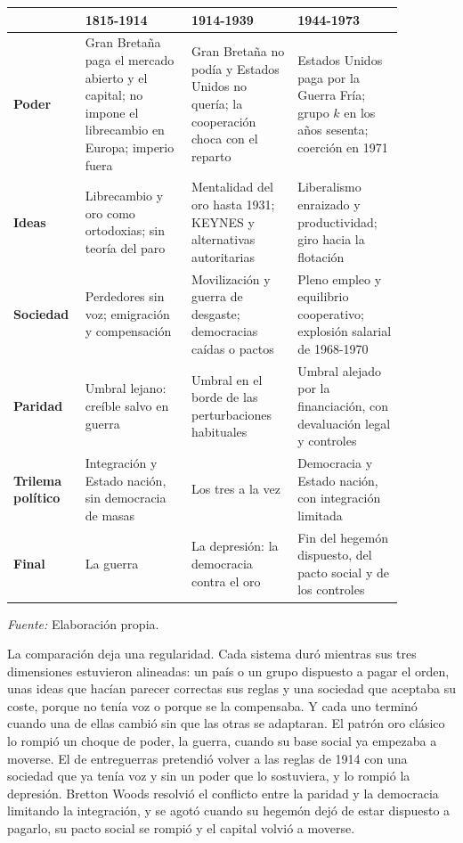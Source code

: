 \documentclass[10pt,a4paper]{article}
\begin{document}
\begin{center}\begin{minipage}{\linewidth}\par\vspace{0.3em}
{\footnotesize
\begin{tabular}{|p{0.12\linewidth}|p{0.25\linewidth}|p{0.25\linewidth}|p{0.25\linewidth}|}
\hline
 & \textbf{1815-1914} & \textbf{1914-1939} & \textbf{1944-1973} \\
\hline
\textbf{Poder} & Gran Bretaña paga el mercado abierto y el capital; no impone el librecambio en Europa; imperio fuera & Gran Bretaña no podía y Estados Unidos no quería; la cooperación choca con el reparto & Estados Unidos paga por la Guerra Fría; grupo $k$ en los años sesenta; coerción en 1971 \\
\hline
\textbf{Ideas} & Librecambio y oro como ortodoxias; sin teoría del paro & Mentalidad del oro hasta 1931; KEYNES y alternativas autoritarias & Liberalismo enraizado y productividad; giro hacia la flotación \\
\hline
\textbf{Sociedad} & Perdedores sin voz; emigración y compensación & Movilización y guerra de desgaste; democracias caídas o pactos & Pleno empleo y equilibrio cooperativo; explosión salarial de 1968-1970 \\
\hline
\textbf{Paridad} & Umbral lejano: creíble salvo en guerra & Umbral en el borde de las perturbaciones habituales & Umbral alejado por la financiación, con devaluación legal y controles \\
\hline
\textbf{Trilema político} & Integración y Estado nación, sin democracia de masas & Los tres a la vez & Democracia y Estado nación, con integración limitada \\
\hline
\textbf{Final} & La guerra & La depresión: la democracia contra el oro & Fin del hegemón dispuesto, del pacto social y de los controles \\
\hline
\end{tabular}}\par\vspace{0.3em} {\small\textit{Fuente: }Elaboración propia.}\end{minipage}\end{center}

La comparación deja una regularidad. Cada sistema duró mientras sus tres dimensiones estuvieron alineadas: un país o un grupo dispuesto a pagar el orden, unas ideas que hacían parecer correctas sus reglas y una sociedad que aceptaba su coste, porque no tenía voz o porque se la compensaba. Y cada uno terminó cuando una de ellas cambió sin que las otras se adaptaran. El patrón oro clásico lo rompió un choque de poder, la guerra, cuando su base social ya empezaba a moverse. El de entreguerras pretendió volver a las reglas de 1914 con una sociedad que ya tenía voz y sin un poder que lo sostuviera, y lo rompió la depresión. Bretton Woods resolvió el conflicto entre la paridad y la democracia limitando la integración, y se agotó cuando su hegemón dejó de estar dispuesto a pagarlo, su pacto social se rompió y el capital volvió a moverse.
\end{document}
